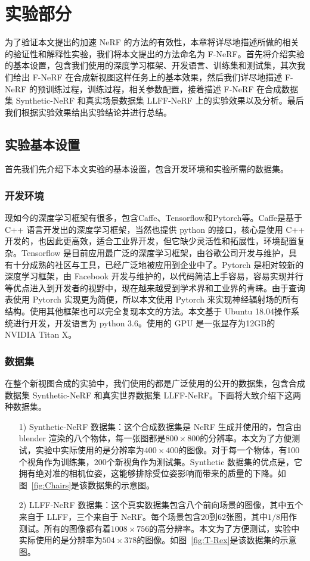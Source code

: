 
\chapter{实验部分}\label{equations}
为了验证本文提出的加速 NeRF 的方法的有效性，本章将详尽地描述所做的相关的验证性和解释性实验，我们将本文提出的方法命名为 F-NeRF。首先将介绍实验的基本设置，包含我们使用的深度学习框架、开发语言、训练集和测试集，其次我们给出 F-NeRF 在合成新视图这样任务上的基本效果，然后我们详尽地描述 F-NeRF 的预训练过程，训练过程，相关参数配置，接着描述 F-NeRF 在合成数据集 Synthetic-NeRF 和真实场景数据集 LLFF-NeRF 上的实验效果以及分析。最后我们根据实验效果给出实验结论并进行总结。
\section{实验基本设置}\label{experiment-set}
首先我们先介绍下本文实验的基本设置，包含开发环境和实验所需的数据集。
\subsection{开发环境}
现如今的深度学习框架有很多，包含Caffe、Tensorflow和Pytorch等。Caffe是基于 C++ 语言开发出的深度学习框架，当然也提供 python 的接口，核心是使用 C++ 开发的，也因此更高效，适合工业界开发，但它缺少灵活性和拓展性，环境配置复杂。Tensorflow 是目前应用最广泛的深度学习框架，由谷歌公司开发与维护，具有十分成熟的社区与工具，已经广泛地被应用到企业中了。Pytorch 是相对较新的深度学习框架，由 Facebook 开发与维护的，以代码简洁上手容易，容易实现并行等优点进入到开发者的视野中，现在越来越受到学术界和工业界的青睐。由于查询表使用 Pytorch 实现更为简便，所以本文使用 Pytorch 来实现神经辐射场的所有结构。使用其他框架也可以完全复现本文的方法。本文基于 Ubuntu 18.04操作系统进行开发，开发语言为 python 3.6。使用的 GPU 是一张显存为12GB的 NVIDIA Titan X。 
\subsection{数据集} \label{Dataset}
在整个新视图合成的实验中，我们使用的都是广泛使用的公开的数据集，包含合成数据集 Synthetic-NeRF 和真实世界数据集 LLFF-NeRF。下面将大致介绍下这两种数据集。
\begin{enumerate}
    \item[1)] Synthetic-NeRF 数据集：这个合成数据集是 NeRF 生成并使用的，包含由 blender 渲染的八个物体，每一张图都是$800 \times 800$的分辨率。本文为了方便测试，实验中实际使用的是分辨率为$400 \times 400$的图像。对于每一个物体，有100个视角作为训练集，200个新视角作为测试集。Synthetic 数据集的优点是，它拥有绝对准的相机位姿，这能够排除受位姿影响而带来的质量的下降。如图~\ref{fig:Chairs}是该数据集的示意图。
    \item[2)] LLFF-NeRF 数据集：这个真实数据集包含八个前向场景的图像，其中五个来自于 LLFF\cite{mildenhall2019local}，三个来自于 NeRF。每个场景包含20到62张图，其中$1/8$用作测试。所有的图像都有着$1008 \times 756$的高分辨率。本文为了方便测试，实验中实际使用的是分辨率为$504 \times 378$的图像。如图~\ref{fig:T-Rex}是该数据集的示意图。
\end{enumerate}

